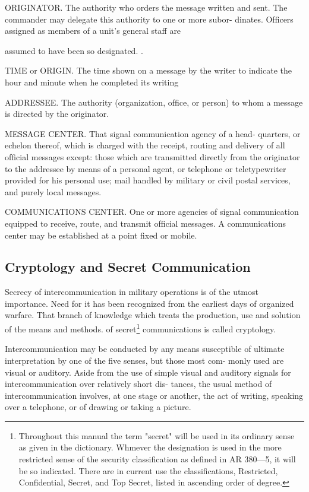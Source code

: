 \mypara ORIGINATOR. The authority who orders the message written and
sent. The commander may delegate this authority to one or more subor-
dinates. Ofﬁcers assigned as members of a unit’s general staff are

assumed to have been so designated. .

\mypara TIME or ORIGIN. The time shown on a message by the writer to
indicate the hour and minute when he completed its writing

\mypara ADDRESSEE. The authority (organization, ofﬁce, or person) to whom
a message is directed by the originator.

\mypara MESSAGE CENTER. That signal communication agency of a head-
quarters, or echelon thereof, which is charged with the receipt, routing
and delivery of all ofﬁcial messages except: those which are transmitted
directly from the originator to the addressee by means of a personal
agent, or telephone or teletypewriter provided for his personal use; mail
handled by military or civil postal services, and purely local messages.

\mypara COMMUNICATIONS CENTER. One or more agencies of signal communication equipped to receive, route, and transmit ofﬁcial messages. A
communications center may be established at a point ﬁxed or mobile.

\subsection{Cryptology and Secret Communication}

\mypara Secrecy of intercommunication in military operations is of the
utmost importance. Need for it has been recognized from the earliest
days of organized warfare. That branch of knowledge which treats the
production, use and solution of the means and methods. of secret\footnote{ Throughout this manual the term "secret" will be used in its ordinary sense as given in the dictionary. Whmever the designation is used in the more restricted sense of the security classiﬁcation as deﬁned in AR 380—5, it will be so indicated. There are in current use the classiﬁcations, Restricted, Conﬁdential, Secret, and Top Secret, listed in ascending order of degree.} communications is called cryptology.


\mypara Intercommunication may be conducted by any means susceptible of
ultimate interpretation by one of the ﬁve senses, but those most com-
monly used are visual or auditory. Aside from the use of simple visual
and auditory signals for intercommunication over relatively short dis-
tances, the usual method of intercommunication involves, at one stage
or another, the act of writing, speaking over a telephone, or of drawing
or taking a picture.

